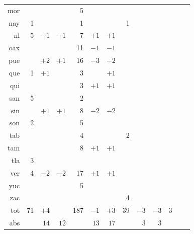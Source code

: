 \documentclass[letter,12pt]{article}
\begin{document}
\begin{table}
\begin{center}
\begin{tabular}{rrrr|rrr|rrr|rrr}
mor &     &     &     &   5 &     &     &     &     &      &    &    & \\       
nay &   1 &     &     &   1 &     &     &   1 &     &      &    &    & \\       
 nl &   5 & $-1$& $-1$&   7 & $+1$& $+1$&     &     &      &    &    & \\       
oax &     &     &     &  11 & $-1$& $-1$&     &     &      &    &    & \\       \hdashline
pue &     & $+2$& $+1$&  16 & $-3$& $-2$&     &     &      &    &    & \\       
que &   1 & $+1$&     &   3 &     & $+1$&     &     &      &    &    & \\       
qui &     &     &     &   3 & $+1$& $+1$&     &     &      &    &    & \\       
san &   5 &     &     &   2 &     &     &     &     &      &    &    & \\       \hdashline
sin &     & $+1$& $+1$&   8 & $-2$& $-2$&     &     &      &    &    & \\       
son &   2 &     &     &   5 &     &     &     &     &      &    &    & \\       
tab &     &     &     &   4 &     &     &   2 &     &      &    &    & \\       
tam &     &     &     &   8 & $+1$& $+1$&     &     &      &    &    & \\       \hdashline
tla &   3 &     &     &     &     &     &     &     &      &    &    & \\       
ver &   4 & $-2$& $-2$&  17 & $+1$& $+1$&     &     &      &    &    & \\       
yuc &     &     &     &   5 &     &     &     &     &      &    &    & \\       
zac &     &     &     &     &     &     &   4 &     &      &    &    & \\ \hline 
tot &  71 & $+4$&     & 187 & $-1$& $+3$&  39 & $-3$& $-3$ & 3  &    & \\       
abs &     & $14$& $12$&      &$13$& $17$&      & $3$&  $3$ &    &    & \\       

\end{tabular}
\end{center}
\end{table}
\end{document}

